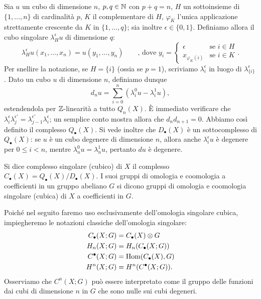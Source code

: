 Sia $u$ un cubo di dimensione $n$, $p,q\in\mathbb{N}$ con $p+q=n$, $H$ un sottoinsieme di $\{1,\ldots,n\}$ di cardinalità $p$, $K$ il complementare di $H$, $\varphi_K$ l'unica applicazione strettamente crescente da $K$ in $\{1,\ldots,q\}$; sia inoltre $\epsilon\in\{0,1\}$. Definiamo allora il cubo singolare $\lambda^\epsilon_Hu$ di dimensione $q$:
$$
\lambda^\epsilon_Hu(x_1,\ldots,x_n)=u(y_1,\ldots,y_n)\qquad\text{, dove }y_i=\begin{cases}\epsilon&\text{se $i\in H$}\\x_{\varphi_K(i)}&\text{se $i\in K$}\end{cases}.
$$
Per snellire la notazione, se $H=\{i\}$ (ossia se $p=1$), scriviamo $\lambda^\epsilon_i$ in luogo di $\lambda^\epsilon_{\{i\}}$. Dato un cubo $u$ di dimensione $n$, definiamo dunque
$$
d_nu=\sum_{i=0}^n(\lambda^0_iu-\lambda^1_iu),
$$
estendendola per $\mathbb{Z}$-linearità a tutto $Q_n(X)$. È immediato verificare che $\lambda^\epsilon_i\lambda^{\epsilon'}_j=\lambda^{\epsilon'}_{j-1}\lambda^\epsilon_i$; un semplice conto mostra allora che $d_nd_{n+1}=0$. Abbiamo così definito il complesso $Q_\bullet(X)$. Si vede inoltre che $D_\bullet(X)$ è un sottocomplesso di $Q_\bullet(X)$: se $u$ è un cubo degenere di dimensione $n$, allora anche $\lambda^\epsilon_iu$ è degenere per $0\le i<n$, mentre $\lambda^0_nu=\lambda^1_nu$, pertanto $du$ è degenere.
\begin{definition}
Si dice complesso singolare (cubico) di $X$ il complesso $C_\bullet(X)=Q_\bullet(X)/D_\bullet(X)$. I suoi gruppi di omologia e coomologia a coefficienti in un gruppo abeliano $G$ si dicono gruppi di omologia e coomologia singolare (cubica) di $X$ a coefficienti in $G$.
\end{definition}
Poiché nel seguito faremo uso esclusivamente dell'omologia singolare cubica, impiegheremo le notazioni classiche dell'omologia singolare: 
\begin{align*}
C_\bullet(X;G)&=C_\bullet(X)\mathbin{\otimes} G\\
H_n(X;G)&=H_n(C_\bullet(X;G))\\
C^\bullet(X;G)&=\operatorname{Hom}(C_\bullet(X),G)\\
H^n(X;G)&=H^n(C^\bullet(X;G)).
\end{align*}
Osserviamo che $C^n(X;G)$ può essere interpretato come il gruppo delle funzioni dai cubi di dimensione $n$ in $G$ che sono nulle sui cubi degeneri.

